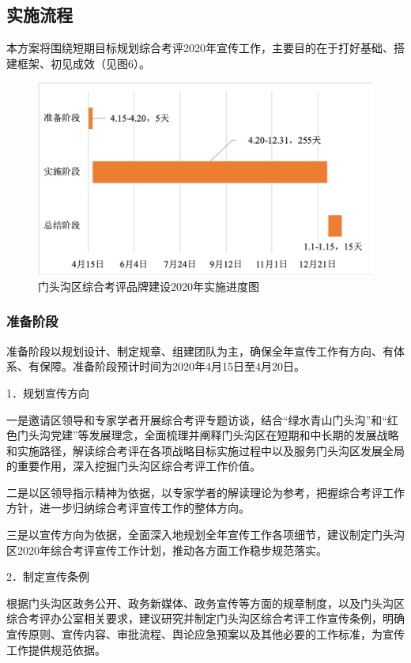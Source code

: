 \documentclass[12pt]{article} %
\begin{document}
\subsection{实施流程}
本方案将围绕短期目标规划综合考评2020年宣传工作，主要目的在于打好基础、搭建框架、初见成效（见图6）。
\begin{figure}[ht]
\centering
\includegraphics[width=\textwidth]{figures/6.png}
\caption{门头沟区综合考评品牌建设2020年实施进度图}
\label{fig:fig1}
\end{figure}

\subsubsection{准备阶段}
准备阶段以规划设计、制定规章、组建团队为主，确保全年宣传工作有方向、有体系、有保障。准备阶段预计时间为2020年4月15日至4月20日。

1．规划宣传方向

一是邀请区领导和专家学者开展综合考评专题访谈，结合“绿水青山门头沟”和“红色门头沟党建”等发展理念，全面梳理并阐释门头沟区在短期和中长期的发展战略和实施路径，解读综合考评在各项战略目标实施过程中以及服务门头沟区发展全局的重要作用，深入挖掘门头沟区综合考评工作价值。

二是以区领导指示精神为依据，以专家学者的解读理论为参考，把握综合考评工作方针，进一步归纳综合考评宣传工作的整体方向。

三是以宣传方向为依据，全面深入地规划全年宣传工作各项细节，建议制定门头沟区2020年综合考评宣传工作计划，推动各方面工作稳步规范落实。

2．制定宣传条例

根据门头沟区政务公开、政务新媒体、政务宣传等方面的规章制度，以及门头沟区综合考评办公室相关要求，建议研究并制定门头沟区综合考评工作宣传条例，明确宣传原则、宣传内容、审批流程、舆论应急预案以及其他必要的工作标准，为宣传工作提供规范依据。
\end{document}

